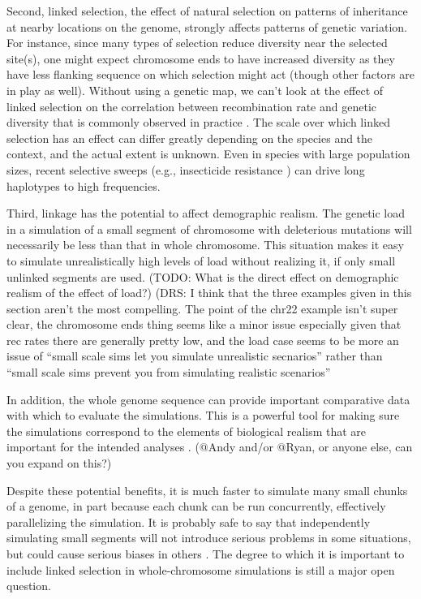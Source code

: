 \documentclass[hidelinks]{article}
\begin{document}
Second, linked selection, the effect of natural selection on
patterns of inheritance at nearby locations on the genome, strongly
affects patterns of genetic variation. For instance, since many types of
selection reduce diversity near the selected site(s), one might expect chromosome ends to
have increased diversity as they have less flanking sequence on which
selection might act (though other factors are in play as well). Without
using a genetic map, we can't look at the effect of linked selection on
the correlation between recombination rate and genetic diversity that is
commonly observed in practice \citep{Begun1992}. The scale over which linked
selection has an effect can differ greatly depending on the
species and the context, and the actual extent is unknown. Even in
species with large population sizes, recent selective sweeps (e.g.,
insecticide resistance \citep{Lynd2010}) can drive long haplotypes to high
frequencies.

Third, linkage has the potential to affect demographic realism. The
genetic load in a simulation of a small segment of chromosome with
deleterious mutations will necessarily be less than that in whole
chromosome. This situation makes it easy to simulate unrealistically
high levels of load without realizing it, if only small unlinked segments are used.
(TODO: What is the direct effect on demographic realism of the effect of
load?) (DRS: I think that the three examples given in this section
aren't the most compelling. The point of the chr22 example isn't super clear,
the chromosome ends thing seems like a minor issue especially given that
rec rates there are generally pretty low, and the load case seems to be
more an issue of ``small scale sims let you simulate unrealistic secnarios''
rather than ``small scale sims prevent you from simulating realistic scenarios''

In addition, the whole genome sequence can provide important comparative
data with which to evaluate the simulations. This is a powerful tool for
making sure the simulations correspond to the elements of biological
realism that are important for the intended analyses \citep{Hsieh2016a}. 
(@Andy and/or @Ryan, or anyone else, can you expand on this?)

Despite these potential benefits, it is much faster to simulate many
small chunks of a genome, in part because each chunk can be run
concurrently, effectively parallelizing the simulation. It is probably
safe to say that independently simulating small segments will not
introduce serious problems in some situations, but could cause serious
biases in others \citep[e.g.,][]{Nelson2020}. The degree to which it is
important to include linked selection in whole-chromosome simulations is
still a major open question.
\end{document}
